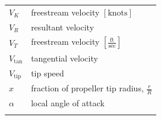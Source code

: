 \documentclass[
]{book}
\begin{document}
\begin{longtable}[]{@{}ll@{}}
\begin{minipage}[t]{0.14\columnwidth}\raggedright
\(V_K\)\strut
\end{minipage} & \begin{minipage}[t]{0.80\columnwidth}\raggedright
freestream velocity \(\left[ \text{knots} \right]\)\strut
\end{minipage}\tabularnewline
\begin{minipage}[t]{0.14\columnwidth}\raggedright
\(V_R\)\strut
\end{minipage} & \begin{minipage}[t]{0.80\columnwidth}\raggedright
resultant velocity\strut
\end{minipage}\tabularnewline
\begin{minipage}[t]{0.14\columnwidth}\raggedright
\(V_T\)\strut
\end{minipage} & \begin{minipage}[t]{0.80\columnwidth}\raggedright
freestream velocity \(\left[ \frac{\text{ft}}{\text{sec}} \right]\)\strut
\end{minipage}\tabularnewline
\begin{minipage}[t]{0.14\columnwidth}\raggedright
\(V_{\text{tan}}\)\strut
\end{minipage} & \begin{minipage}[t]{0.80\columnwidth}\raggedright
tangential velocity\strut
\end{minipage}\tabularnewline
\begin{minipage}[t]{0.14\columnwidth}\raggedright
\(V_{\text{tip}}\)\strut
\end{minipage} & \begin{minipage}[t]{0.80\columnwidth}\raggedright
tip speed\strut
\end{minipage}\tabularnewline
\begin{minipage}[t]{0.14\columnwidth}\raggedright
\(x\)\strut
\end{minipage} & \begin{minipage}[t]{0.80\columnwidth}\raggedright
fraction of propeller tip radius, \(\frac{r}{R}\)\strut
\end{minipage}\tabularnewline
\begin{minipage}[t]{0.14\columnwidth}\raggedright
\(\alpha\)\strut
\end{minipage} & \begin{minipage}[t]{0.80\columnwidth}\raggedright
local angle of attack\strut
\end{minipage}\tabularnewline
\begin{minipage}[t]{0.14\columnwidth}\raggedright

\end{minipage}
\end{longtable}
\end{document}
